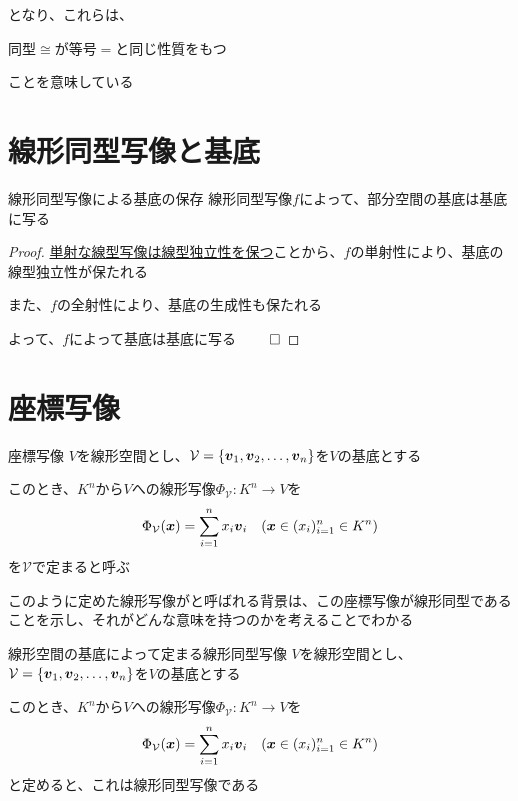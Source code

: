 \documentclass[../../../topic_linear-algebra]{subfiles}
\begin{document}
となり、これらは、
\begin{shaded}
  同型$\cong$が等号$=$と同じ性質をもつ
\end{shaded}
ことを意味している

\sectionline
\section{線形同型写像と基底}

\begin{theorem}{線形同型写像による基底の保存}
  線形同型写像$f$によって、部分空間の基底は基底に写る
\end{theorem}

\begin{proof}
  \hyperref[thm:injective-preserves-independence]{単射な線型写像は線型独立性を保つ}ことから、$f$の単射性により、基底の線型独立性が保たれる

  また、$f$の全射性により、基底の生成性も保たれる

  よって、$f$によって基底は基底に写る $\qed$
\end{proof}

\sectionline
\section{座標写像}

\begin{definition}{座標写像}\label{def:coordinate-mapping}
  $V$を線形空間とし、$\mathcal{V} = \{ \vb*{v}_1, \vb*{v}_2, \dots, \vb*{v}_n \}$を$V$の基底とする

  このとき、$K^n$から$V$への線形写像$\Phi_{\mathcal{V}}\colon K^n \to V$を
  \begin{equation*}
    \Phi_{\mathcal{V}}(\vb*{x}) = \sum_{i=1}^n x_i \vb*{v}_i \quad (\vb*{x} \in (x_i)_{i=1}^n \in K^n)
  \end{equation*}
  を$\mathcal{V}$で定まると呼ぶ
\end{definition}

このように定めた線形写像がと呼ばれる背景は、この座標写像が線形同型であることを示し、それがどんな意味を持つのかを考えることでわかる

\begin{theorem}{線形空間の基底によって定まる線形同型写像}
  $V$を線形空間とし、$\mathcal{V} = \{ \vb*{v}_1, \vb*{v}_2, \dots, \vb*{v}_n \}$を$V$の基底とする

  このとき、$K^n$から$V$への線形写像$\Phi_{\mathcal{V}}\colon K^n \to V$を
  \begin{equation*}
    \Phi_{\mathcal{V}}(\vb*{x}) = \sum_{i=1}^n x_i \vb*{v}_i \quad (\vb*{x} \in (x_i)_{i=1}^n \in K^n)
  \end{equation*}
  と定めると、これは線形同型写像である
\end{theorem}
\end{document}
